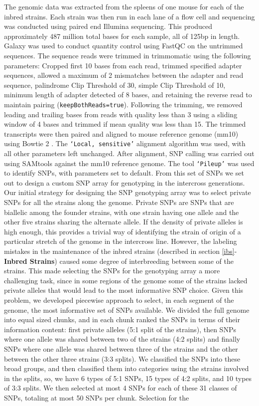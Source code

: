 \begin{refsection}
The genomic data was extracted from the spleens of one mouse for each of the inbred strains. Each strain was then run in each lane of a flow cell and sequencing was conducted using paired end Illumina sequencing. This produced approximately 487 million total bases for each sample, all of 125bp in length. Galaxy \parencite{Goecks2010-hz} was used to conduct quantity control using FastQC on the untrimmed sequences. The sequence reads were trimmed in trimmomatic \parencite{Bolger2014-ra} using the following parameters: Cropped first 10 bases from each read, trimmed specified adapter sequences, allowed a maximum of 2 mismatches between the adapter and read sequence, palindrome Clip Threshold of 30, simple Clip Threshold of 10, minimum length of adapter detected of 8 bases, and retaining the reverse read to maintain pairing (\texttt{keepBothReads=true}). Following the trimming, we removed leading and trailing bases from reads with quality less than 3 using a sliding window of 4 bases and trimmed if mean quality was less than 15. The trimmed transcripts were then paired and aligned to mouse reference genome (mm10) using Bowtie 2 \parencite{Langmead2012-ev}. The \texttt{‘Local, sensitive’} alignment algorithm was used, with all other parameters left unchanged. After alignment, SNP calling was carried out using SAMtools \parencite{Li2009-yr} against the mm10 reference genome. The tool \texttt{‘Pileup’} was used to identify SNPs, with  parameters set to default. From this set of SNPs we set out to design a custom SNP array for genotyping in the intercross generations. Our initial strategy for designing the SNP genotyping array was to select private SNPs for all the strains along the genome. Private SNPs are SNPs that are biallelic among the founder strains, with one strain having one allele and the other five strains sharing the alternate allele. If the density of private alleles is high enough, this provides a trivial way of identifying the strain of origin of a particular stretch of the genome in the intercross line. However, the labeling mistakes in the maintenance of the inbred strains (described in section \ref{ibs}-\textbf{Inbred Strains}) caused some degree of interbreeding between some of the strains. This made selecting the SNPs for the genotyping array a more challenging task, since in some regions of the genome some of the strains lacked private alleles that would lead to the most informative SNP choice. Given this problem, we developed piecewise approach to select, in each segment of the genome, the most informative set of SNPs available. We divided the full genome into equal sized chunks, and in each chunk ranked the SNPs in terms of their information content: first private alleles (5:1 split of the strains), then SNPs where one allele was shared between two of the strains (4:2 splits) and finally SNPs where one allele was shared between three of the strains and the other between the other three strains (3:3 splits). We classified the SNPs into these broad groups, and then classified them into categories using the strains involved in the splits, so, we have 6 types of 5:1 SNPs, 15 types of 4:2 splits, and 10 types of 3:3 splits. We then selected at most 4 SNPs for each of these 31 classes of SNPs, totaling at most 50 SNPs per chunk. Selection for the 
\end{refsection}
